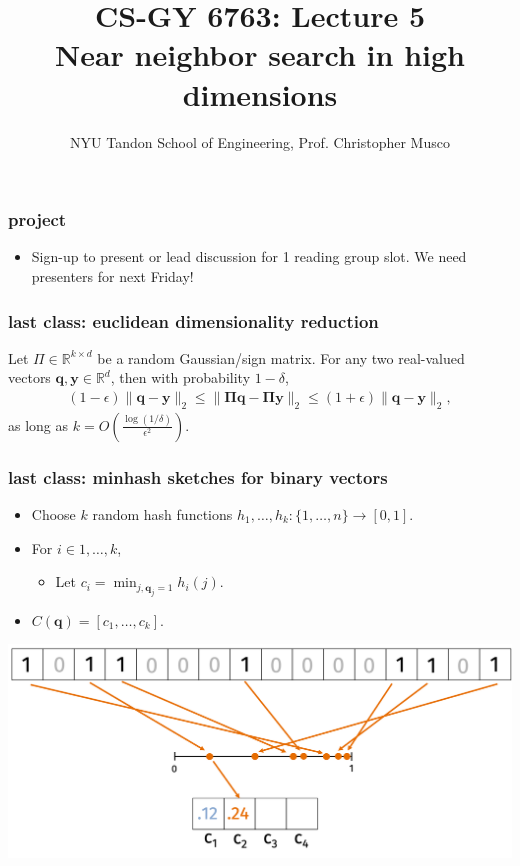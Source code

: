 \documentclass[compress]{beamer}
\title{CS-GY 6763: Lecture 5 \\ Near neighbor search in high dimensions}
\author{NYU Tandon School of Engineering, Prof. Christopher Musco}
\date{}
\newcommand{\bs}[1]{\boldsymbol{#1}}
\newcommand{\bv}[1]{\mathbf{#1}}
\newcommand{\R}{\mathbb{R}}
\begin{document}
\begin{frame}
	\titlepage 
\end{frame}


\begin{frame}[t]
	\frametitle{project}
	\begin{itemize}
		\item Sign-up to present or lead discussion for 1 reading group slot. We need presenters for next Friday!
	\end{itemize}
\end{frame}

\begin{frame}
	\frametitle{last class: euclidean dimensionality reduction}
	\begin{lemma}
		Let $\Pi \in \R^{k\times d}$ be a random Gaussian/sign matrix. For any two 
		real-valued vectors $\bv{q}, \bv{y} \in \R^d$, then with probability $1-\delta$,
		\begin{align*}
			(1-\epsilon)\|\bv{q} - \bv{y}\|_2 \leq \|\bs{\Pi}\bv{q} - \bs{\Pi}\bv{y}\|_2 \leq (1+\epsilon)\|\bv{q} - \bv{y}\|_2,
		\end{align*}
	 as long as $k = O\left(\frac{\log(1/\delta)}{\epsilon^2}\right)$.
	\end{lemma}
\end{frame}

\begin{frame}
	\frametitle{last class: minhash sketches for binary vectors}
	\begin{itemize}
		\item Choose $k$ random hash functions $h_1, \ldots, h_k: \{1,\ldots, n\} \rightarrow [0,1]$. 
		\item For $i\in 1, \ldots,k$, 
		\begin{itemize}
			\item Let $c_i = \min_{j, \bv{q}_j = 1} h_i(j)$.
		\end{itemize}
		\item $C(\bv{q}) = [c_1, \ldots, c_k]$.
	\end{itemize}
	\begin{center}
		\includegraphics[width=\textwidth]{minHash2.png}	
	\end{center}
\end{frame}
\end{document}
